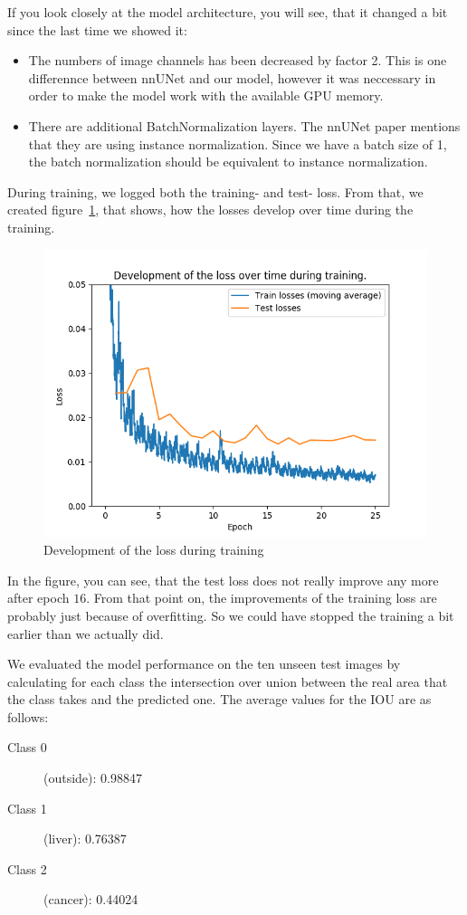 \documentclass{article}
\begin{document}
		If you look closely at the model architecture, you will see, that it changed a bit since the last time we showed it:

		\begin{itemize}
			\item The numbers of image channels has been decreased by factor 2. This is one differennce between nnUNet and our model, however it was neccessary in order to make the model work with the available GPU memory.
			\item There are additional BatchNormalization layers. The nnUNet paper mentions that they are using instance normalization. Since we have a batch size of 1, the batch normalization should be equivalent to instance normalization.
		\end{itemize}

		During training, we logged both the training- and test- loss. From that, we created figure~\ref{fig:lossdev}, that shows, how the losses develop over time during the training.

		\begin{figure}[htbp]
			\centering
			\includegraphics[width=.5\textwidth]{loss_over_time.png}
			\caption{Development of the loss during training}
			\label{fig:lossdev}
		\end{figure}

		In the figure, you can see, that the test loss does not really improve any more after epoch $16$. From that point on, the improvements of the training loss are probably just because of overfitting. So we could have stopped the training a bit earlier than we actually did.

		We evaluated the model performance on the ten unseen test images by calculating for each class the intersection over union between the real area that the class takes and the predicted one. The average values for the IOU are as follows:

		\begin{description}
			\item[Class 0] (outside): 0.98847
			\item[Class 1] (liver): 0.76387
			\item[Class 2] (cancer): 0.44024
		\end{description}
\end{document}
